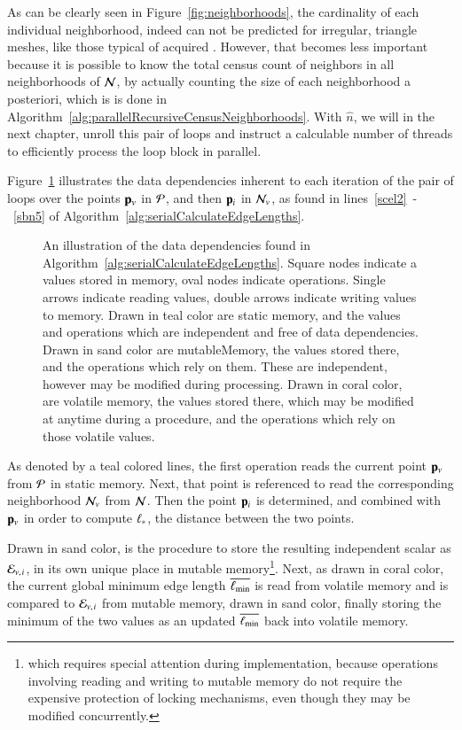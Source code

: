 As can be clearly seen in Figure~\ref{fig:neighborhoods}, the cardinality of each individual neighborhood, indeed can not be predicted for irregular, triangle meshes, like those typical of acquired \tdd{}. However, that becomes less important because it is possible to know the total census count of neighbors in all neighborhoods of $\mathcal{N}$, by actually counting the size of each neighborhood a posteriori, which is is done in Algorithm~\ref{alg:parallelRecursiveCensusNeighborhoods}. With $\hat{n}$, we will in the next chapter, unroll this pair of loops and instruct a calculable number of threads to efficiently process the loop block in parallel.

Figure~\ref{fig:sacelDataDependencies} illustrates the data dependencies inherent to each iteration of the pair of loops over the points $\mathbf{p}_v$ in $\mathcal{P}$, and then $\mathbf{p}_i$ in $\mathcal{N}_v$, as found in lines~\ref{scel2}~-~\ref{sbn5} of Algorithm~\ref{alg:serialCalculateEdgeLengths}.

\begin{figure}[ht]
	
	{\caption[Data Dependencies in Serial Algorithm~\ref{alg:serialCalculateEdgeLengths}: Calculate Edge Lengths]{An illustration of the data dependencies found in Algorithm~\ref{alg:serialCalculateEdgeLengths}. Square nodes indicate a values stored in memory, oval nodes indicate operations. Single arrows indicate reading values, double arrows indicate writing values to memory. Drawn in teal color are static memory, and the values and operations which are independent and free of data dependencies. Drawn in sand color are \gls{mutableMemory}, the values stored there, and the operations which rely on them. These are independent, however may be modified during processing. Drawn in coral color, are volatile memory, the values stored there, which may be modified at anytime during a procedure, and the operations which rely on those volatile values.}\label{fig:sacelDataDependencies}}
\end{figure}

As denoted by a teal colored lines, the first operation reads the current point $\mathbf{p}_v$ from $\mathcal{P}$ in static memory. Next, that point is referenced to read the corresponding neighborhood $\mathcal{N}_v$ from $\mathcal{N}$. Then the point $\mathbf{p}_i$ is determined, and combined with $\mathbf{p}_v$ in order to compute $\ell_\ast$, the distance between the two points.

Drawn in sand color, is the procedure to store the resulting independent scalar as $\mathcal{E}_{v,\kern.75pt i}$, in its own unique place in mutable memory\footnote{which requires special attention during implementation, because operations involving reading and writing to mutable memory do not require the expensive protection of locking mechanisms, even though they may be modified concurrently.}. Next, as drawn in coral color, the current global minimum edge length $\overline{\ell_\text{min}}$ is read from volatile memory and is compared to $\mathcal{E}_{v,\kern.75pt i}$ from mutable memory, drawn in sand color, finally storing the minimum of the two values as an updated $\overline{\ell_\text{min}}$ back into volatile memory.

